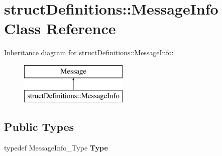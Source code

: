 \hypertarget{classstruct_definitions_1_1_message_info}{}\section{struct\+Definitions\+:\+:Message\+Info Class Reference}
\label{classstruct_definitions_1_1_message_info}
Inheritance diagram for struct\+Definitions\+:\+:Message\+Info\+:\begin{figure}[H]
\begin{center}
\leavevmode
\includegraphics[height=2.000000cm]{classstruct_definitions_1_1_message_info}
\end{center}
\end{figure}
\subsection*{Public Types}
\begin{DoxyCompactItemize}
\item 
\hypertarget{classstruct_definitions_1_1_message_info_a9022b3835ce5a11b4cc50ffd3a1b7098}{}\label{classstruct_definitions_1_1_message_info_a9022b3835ce5a11b4cc50ffd3a1b7098} 
typedef Message\+Info\+\_\+\+Type {\bfseries Type}
\end{DoxyCompactItemize}
